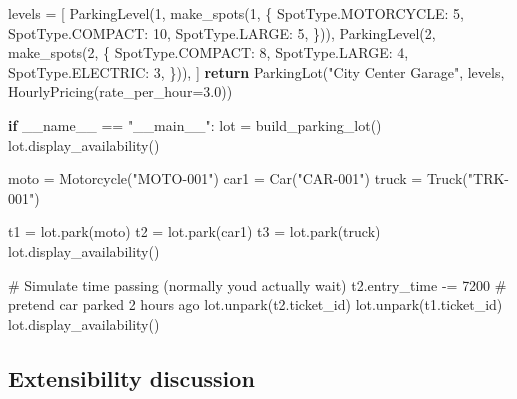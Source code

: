 \documentclass[11pt]{article}
\newenvironment{Shaded}{\begin{snugshade}}{\end{snugshade}}
\newcommand{\CommentTok}[1]{\textcolor[rgb]{0.48,0.49,0.49}{#1}}
\newcommand{\ControlFlowTok}[1]{\textcolor[rgb]{0.99,0.74,0.29}{\textbf{#1}}}
\newcommand{\DecValTok}[1]{\textcolor[rgb]{0.96,0.45,0.00}{#1}}
\newcommand{\FloatTok}[1]{\textcolor[rgb]{0.96,0.45,0.00}{#1}}
\newcommand{\NormalTok}[1]{\textcolor[rgb]{0.81,0.81,0.76}{#1}}
\newcommand{\OperatorTok}[1]{\textcolor[rgb]{0.81,0.81,0.76}{#1}}
\newcommand{\StringTok}[1]{\textcolor[rgb]{0.96,0.31,0.31}{#1}}
\newcommand{\VariableTok}[1]{\textcolor[rgb]{0.15,0.68,0.68}{#1}}
\begin{document}
\begin{Shaded}
\begin{Highlighting}[]
\NormalTok{    levels }\OperatorTok{=}\NormalTok{ [}
\NormalTok{        ParkingLevel(}\DecValTok{1}\NormalTok{, make\_spots(}\DecValTok{1}\NormalTok{, \{}
\NormalTok{            SpotType.MOTORCYCLE: }\DecValTok{5}\NormalTok{,}
\NormalTok{            SpotType.COMPACT: }\DecValTok{10}\NormalTok{,}
\NormalTok{            SpotType.LARGE: }\DecValTok{5}\NormalTok{,}
\NormalTok{        \})),}
\NormalTok{        ParkingLevel(}\DecValTok{2}\NormalTok{, make\_spots(}\DecValTok{2}\NormalTok{, \{}
\NormalTok{            SpotType.COMPACT: }\DecValTok{8}\NormalTok{,}
\NormalTok{            SpotType.LARGE: }\DecValTok{4}\NormalTok{,}
\NormalTok{            SpotType.ELECTRIC: }\DecValTok{3}\NormalTok{,}
\NormalTok{        \})),}
\NormalTok{    ]}
    \ControlFlowTok{return}\NormalTok{ ParkingLot(}\StringTok{"City Center Garage"}\NormalTok{, levels, HourlyPricing(rate\_per\_hour}\OperatorTok{=}\FloatTok{3.0}\NormalTok{))}


\ControlFlowTok{if} \VariableTok{\_\_name\_\_} \OperatorTok{==} \StringTok{"\_\_main\_\_"}\NormalTok{:}
\NormalTok{    lot }\OperatorTok{=}\NormalTok{ build\_parking\_lot()}
\NormalTok{    lot.display\_availability()}

\NormalTok{    moto }\OperatorTok{=}\NormalTok{ Motorcycle(}\StringTok{"MOTO{-}001"}\NormalTok{)}
\NormalTok{    car1 }\OperatorTok{=}\NormalTok{ Car(}\StringTok{"CAR{-}001"}\NormalTok{)}
\NormalTok{    truck }\OperatorTok{=}\NormalTok{ Truck(}\StringTok{"TRK{-}001"}\NormalTok{)}

\NormalTok{    t1 }\OperatorTok{=}\NormalTok{ lot.park(moto)}
\NormalTok{    t2 }\OperatorTok{=}\NormalTok{ lot.park(car1)}
\NormalTok{    t3 }\OperatorTok{=}\NormalTok{ lot.park(truck)}
\NormalTok{    lot.display\_availability()}

    \CommentTok{\# Simulate time passing (normally you\textquotesingle{}d actually wait)}
\NormalTok{    t2.entry\_time }\OperatorTok{{-}=} \DecValTok{7200}  \CommentTok{\# pretend car parked 2 hours ago}
\NormalTok{    lot.unpark(t2.ticket\_id)}
\NormalTok{    lot.unpark(t1.ticket\_id)}
\NormalTok{    lot.display\_availability()}
\end{Highlighting}
\end{Shaded}

\subsection{Extensibility discussion}\label{extensibility-discussion-1}
\end{document}
